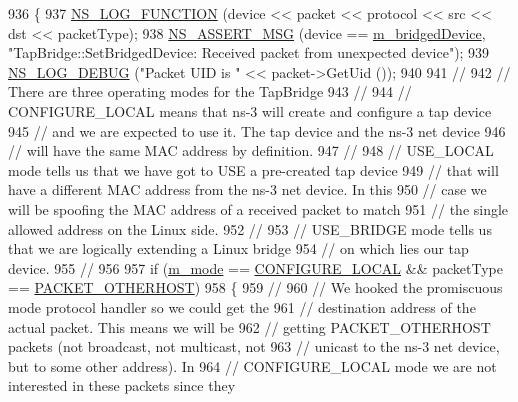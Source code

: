 \begin{DoxyCode}
936 \{
937   \hyperlink{log-macros-disabled_8h_a90b90d5bad1f39cb1b64923ea94c0761}{NS\_LOG\_FUNCTION} (device << packet << protocol << src << dst << packetType);
938   \hyperlink{assert_8h_aff5ece9066c74e681e74999856f08539}{NS\_ASSERT\_MSG} (device == \hyperlink{classns3_1_1TapBridge_ac4ba97368116b628d632d318d5562420}{m\_bridgedDevice}, \textcolor{stringliteral}{"TapBridge::SetBridgedDevice: 
       Received packet from unexpected device"});
939   \hyperlink{group__logging_ga413f1886406d49f59a6a0a89b77b4d0a}{NS\_LOG\_DEBUG} (\textcolor{stringliteral}{"Packet UID is "} << packet->GetUid ());
940 
941   \textcolor{comment}{//}
942   \textcolor{comment}{// There are three operating modes for the TapBridge}
943   \textcolor{comment}{//}
944   \textcolor{comment}{// CONFIGURE\_LOCAL means that ns-3 will create and configure a tap device}
945   \textcolor{comment}{// and we are expected to use it.  The tap device and the ns-3 net device}
946   \textcolor{comment}{// will have the same MAC address by definition.}
947   \textcolor{comment}{//}
948   \textcolor{comment}{// USE\_LOCAL mode tells us that we have got to USE a pre-created tap device}
949   \textcolor{comment}{// that will have a different MAC address from the ns-3 net device.  In this}
950   \textcolor{comment}{// case we will be spoofing the MAC address of a received packet to match}
951   \textcolor{comment}{// the single allowed address on the Linux side.}
952   \textcolor{comment}{//}
953   \textcolor{comment}{// USE\_BRIDGE mode tells us that we are logically extending a Linux bridge}
954   \textcolor{comment}{// on which lies our tap device.}
955   \textcolor{comment}{//}
956 
957   \textcolor{keywordflow}{if} (\hyperlink{classns3_1_1TapBridge_aaae30bc9d5dd36e3a4d569cf9bcf40eb}{m\_mode} == \hyperlink{classns3_1_1TapBridge_acac8d3ebe259ddfa9cd369515f04618daf2d0f6c8152d38e9400b2d9fd35f02a3}{CONFIGURE\_LOCAL} && packetType == 
      \hyperlink{classns3_1_1NetDevice_ace65153f09144f55a0d3e702fc29d6b2a60c00fab4286dd2903e2b197a9f8c6c8}{PACKET\_OTHERHOST})
958     \{
959       \textcolor{comment}{//}
960       \textcolor{comment}{// We hooked the promiscuous mode protocol handler so we could get the }
961       \textcolor{comment}{// destination address of the actual packet.  This means we will be }
962       \textcolor{comment}{// getting PACKET\_OTHERHOST packets (not broadcast, not multicast, not }
963       \textcolor{comment}{// unicast to the ns-3 net device, but to some other address).  In }
964       \textcolor{comment}{// CONFIGURE\_LOCAL mode we are not interested in these packets since they }

\end{DoxyCode}
